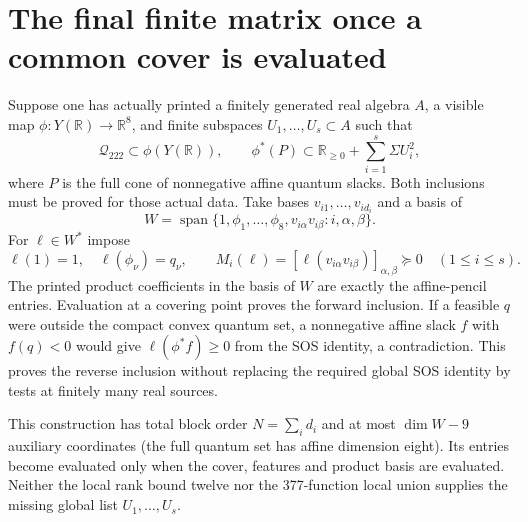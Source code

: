 \documentclass[11pt]{article}
\newcommand{\R}{\mathbb R}
\begin{document}
\section{The final finite matrix once a common cover is evaluated}

Suppose one has actually printed a finitely generated real algebra
$A$, a visible map $\phi:Y(\R)\to\R^8$, and finite subspaces
$U_1,\ldots,U_s\subset A$ such that
\[
 \mathcal Q_{222}\subset\phi(Y(\R)),\qquad
 \phi^*(P)\subset\R_{\ge0}+\sum_{i=1}^{s}\Sigma U_i^2,
\]
where $P$ is the full cone of nonnegative affine quantum slacks.
Both inclusions must be proved for those actual data.
Take bases $v_{i1},\ldots,v_{id_i}$ and a basis of
\[
 W=\operatorname{span}\{1,\phi_1,\ldots,\phi_8,
                v_{i\alpha}v_{i\beta}:i,\alpha,\beta\}.
\]
For $\ell\in W^*$ impose
\[
 \ell(1)=1,\quad \ell(\phi_\nu)=q_\nu,\qquad
 M_i(\ell)=[\ell(v_{i\alpha}v_{i\beta})]_{\alpha,\beta}
                         \succeq0\quad(1\le i\le s).
\]
The printed product coefficients in the basis of $W$ are exactly
the affine-pencil entries. Evaluation at a covering point proves
the forward inclusion. If a feasible $q$ were outside the compact
convex quantum set, a nonnegative affine slack $f$ with $f(q)<0$
would give
$\ell(\phi^*f)\ge0$ from the SOS identity, a contradiction.
This proves the reverse inclusion without replacing the required
global SOS identity by tests at finitely many real sources.

This construction has total block order $N=\sum_i d_i$ and at
most $\dim W-9$ auxiliary coordinates (the full quantum set has
affine dimension eight). Its entries become evaluated only when
the cover, features and product basis are evaluated. Neither the
local rank bound twelve nor the 377-function local union
supplies the missing global list $U_1,\ldots,U_s$.
\end{document}
